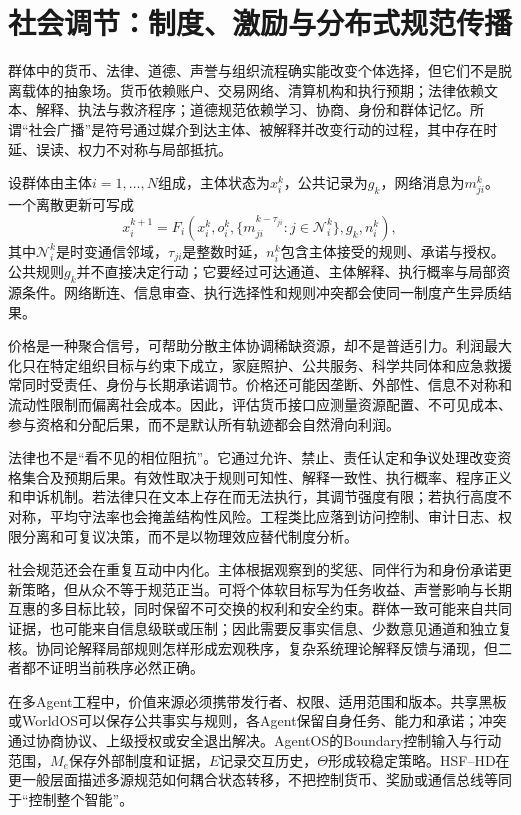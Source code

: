 \section{社会调节：制度、激励与分布式规范传播}
\label{sec:collective_gauge_source}

群体中的货币、法律、道德、声誉与组织流程确实能改变个体选择，但它们不是脱离载体的抽象场。货币依赖账户、交易网络、清算机构和执行预期；法律依赖文本、解释、执法与救济程序；道德规范依赖学习、协商、身份和群体记忆。所谓“社会广播”是符号通过媒介到达主体、被解释并改变行动的过程，其中存在时延、误读、权力不对称与局部抵抗。

设群体由主体$i=1,\ldots,N$组成，主体状态为$x_i^k$，公共记录为$g_k$，网络消息为$m_{ji}^k$。一个离散更新可写成
\[
x_i^{k+1}=F_i\!\left(x_i^k,o_i^k,
\{m_{ji}^{k-\tau_{ji}}:j\in\mathcal N_i^k\},g_k,n_i^k\right),
\]
其中$\mathcal N_i^k$是时变通信邻域，$\tau_{ji}$是整数时延，$n_i^k$包含主体接受的规则、承诺与授权。公共规则$g_k$并不直接决定行动；它要经过可达通道、主体解释、执行概率与局部资源条件。网络断连、信息审查、执行选择性和规则冲突都会使同一制度产生异质结果。

价格是一种聚合信号，可帮助分散主体协调稀缺资源，却不是普适引力。利润最大化只在特定组织目标与约束下成立，家庭照护、公共服务、科学共同体和应急救援常同时受责任、身份与长期承诺调节。价格还可能因垄断、外部性、信息不对称和流动性限制而偏离社会成本。因此，评估货币接口应测量资源配置、不可见成本、参与资格和分配后果，而不是默认所有轨迹都会自然滑向利润。

法律也不是“看不见的相位阻抗”。它通过允许、禁止、责任认定和争议处理改变资格集合及预期后果。有效性取决于规则可知性、解释一致性、执行概率、程序正义和申诉机制。若法律只在文本上存在而无法执行，其调节强度有限；若执行高度不对称，平均守法率也会掩盖结构性风险。工程类比应落到访问控制、审计日志、权限分离和可复议决策，而不是以物理效应替代制度分析。

社会规范还会在重复互动中内化。主体根据观察到的奖惩、同伴行为和身份承诺更新策略，但从众不等于规范正当。可将个体软目标写为任务收益、声誉影响与长期互惠的多目标比较，同时保留不可交换的权利和安全约束。群体一致可能来自共同证据，也可能来自信息级联或压制；因此需要反事实信息、少数意见通道和独立复核。协同论解释局部规则怎样形成宏观秩序，复杂系统理论解释反馈与涌现，但二者都不证明当前秩序必然正确。

在多Agent工程中，价值来源必须携带发行者、权限、适用范围和版本。共享黑板或WorldOS可以保存公共事实与规则，各Agent保留自身任务、能力和承诺；冲突通过协商协议、上级授权或安全退出解决。AgentOS的Boundary控制输入与行动范围，$M_e$保存外部制度和证据，$E$记录交互历史，$\Theta$形成较稳定策略。HSF--HD在更一般层面描述多源规范如何耦合状态转移，不把控制货币、奖励或通信总线等同于“控制整个智能”。


